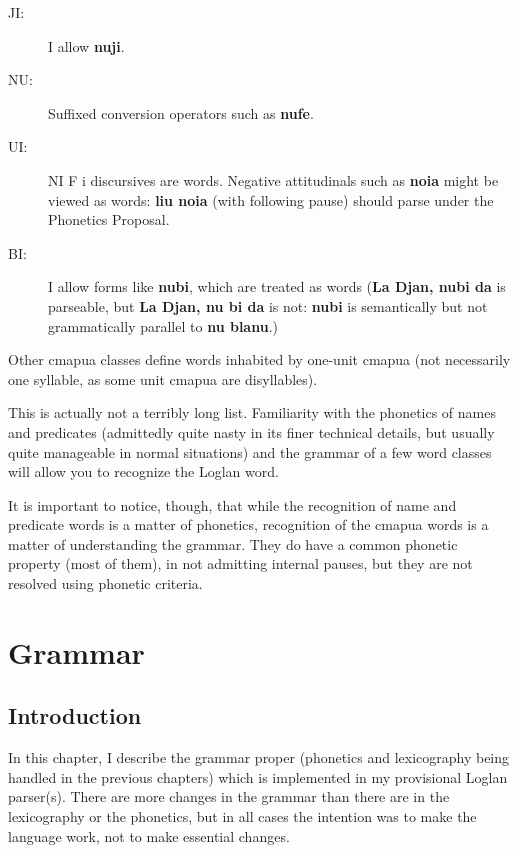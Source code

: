 \documentclass[12pt]{book}
\begin{document}
{\begin{description}
\item[JI:]  I allow {\bf nuji}.

\item[NU:]  Suffixed conversion operators such as {\bf nufe}.

\item[UI:]  NI F i discursives are words.  Negative attitudinals such as {\bf noia} might be viewed as words:  {\bf liu noia} (with following pause) should parse under the Phonetics Proposal.

\item[BI:]  I allow forms like {\bf nubi}, which are treated as words ({\bf La Djan, nubi da} is parseable, but {\bf La Djan, nu bi da} is not:  {\bf nubi} is semantically but not grammatically parallel to {\bf nu blanu}.)

\end{description}

Other cmapua classes define words inhabited by one-unit cmapua (not necessarily one syllable, as some unit cmapua are disyllables).

This is actually not a terribly long list.  Familiarity with the phonetics of names and predicates (admittedly quite nasty in its finer technical details, but usually quite manageable in normal situations) and the grammar of a few word classes will allow you to recognize the Loglan word.   

It is important to notice, though, that while the recognition of name and predicate words is a matter of phonetics, recognition of the cmapua words is a matter of understanding the grammar.  They do have a common phonetic property (most of them), in not admitting internal pauses, but they are not resolved using phonetic criteria.

\chapter{Grammar}

\section{Introduction}

In this chapter, I describe the grammar proper (phonetics and lexicography being handled in the previous chapters) which is implemented in my provisional Loglan parser(s).  There are more changes in the grammar than there are in the lexicography or the phonetics, but in all cases the intention was to make the language work, not to make essential changes.

}
\end{document}
